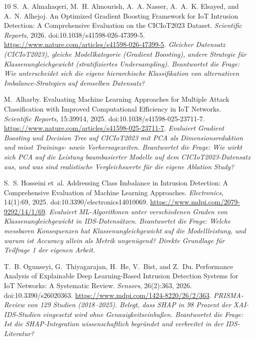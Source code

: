 \documentclass[letterpaper,twocolumn,10pt]{article}
\begin{document}
\begin{thebibliography}{10}
S.~A. Almahaqeri, M.~H. Almourish, A.~A. Nasser, A.~A.~K. Elsayed,
  and A.~N. Alhejoj.
\newblock An Optimized Gradient Boosting Framework for IoT Intrusion
  Detection: A Comprehensive Evaluation on the CICIoT2023 Dataset.
\newblock \emph{Scientific Reports}, 2026. doi:10.1038/s41598-026-47399-5.
  \url{https://www.nature.com/articles/s41598-026-47399-5}.
\newblock \textit{Gleicher Datensatz (CICIoT2023), gleiche
  Modellkategorie (Gradient Boosting), andere Strategie für
  Klassenungleichgewicht (stratifiziertes Undersampling). Beantwortet
  die Frage: Wie unterscheidet sich die eigene hierarchische
  Klassifikation von alternativen Imbalance-Strategien auf demselben
  Datensatz?}

M.~Alharby.
\newblock Evaluating Machine Learning Approaches for Multiple Attack
  Classification with Improved Computational Efficiency in IoT Networks.
\newblock \emph{Scientific Reports}, 15:39914, 2025.
  doi:10.1038/s41598-025-23711-7.
  \url{https://www.nature.com/articles/s41598-025-23711-7}.
\newblock \textit{Evaluiert Gradient Boosting und Decision Tree auf
  CICIoT2023 mit PCA als Dimensionsreduktion und misst Trainings- sowie
  Vorhersagezeiten. Beantwortet die Frage: Wie wirkt sich PCA auf die
  Leistung baumbasierter Modelle auf dem CICIoT2023-Datensatz aus, und
  was sind realistische Vergleichswerte für die eigene Ablation Study?}

S.~S. Hosseini et~al.
\newblock Addressing Class Imbalance in Intrusion Detection: A
  Comprehensive Evaluation of Machine Learning Approaches.
\newblock \emph{Electronics}, 14(1):69, 2025.
  doi:10.3390/electronics14010069.
  \url{https://www.mdpi.com/2079-9292/14/1/69}.
\newblock \textit{Evaluiert ML-Algorithmen unter verschiedenen Graden
  von Klassenungleichgewicht in IDS-Datensätzen. Beantwortet die Frage:
  Welche messbaren Konsequenzen hat Klassenungleichgewicht auf die
  Modellleistung, und warum ist Accuracy allein als Metrik ungenügend?
  Direkte Grundlage für Teilfrage 1 der eigenen Arbeit.}

T.~B. Ogunseyi, G.~Thiyagarajan, H.~He, V.~Bist, and Z.~Du.
\newblock Performance Analysis of Explainable Deep Learning-Based
  Intrusion Detection Systems for IoT Networks: A Systematic Review.
\newblock \emph{Sensors}, 26(2):363, 2026. doi:10.3390/s26020363.
  \url{https://www.mdpi.com/1424-8220/26/2/363}.
\newblock \textit{PRISMA-Review von 129 Studien (2018--2025). Belegt,
  dass SHAP in 98 Prozent der XAI-IDS-Studien eingesetzt wird ohne
  Genauigkeitseinbußen. Beantwortet die Frage: Ist die
  SHAP-Integration wissenschaftlich begründet und verbreitet in der
  IDS-Literatur?}


\end{thebibliography}
\end{document}

